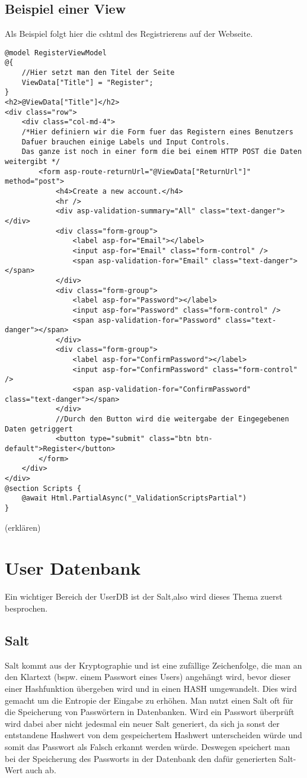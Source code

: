 {\subsection{Beispiel einer View}
\label{mvc_view_beispiel}
Als Beispiel folgt hier die cshtml des Registrierens auf der Webseite.
\begin{lstlisting}
@model RegisterViewModel
@{
	//Hier setzt man den Titel der Seite
    ViewData["Title"] = "Register";
}
<h2>@ViewData["Title"]</h2>
<div class="row">
    <div class="col-md-4">
    /*Hier definiern wir die Form fuer das Registern eines Benutzers
    Dafuer brauchen einige Labels und Input Controls. 
    Das ganze ist noch in einer form die bei einem HTTP POST die Daten weitergibt */
        <form asp-route-returnUrl="@ViewData["ReturnUrl"]" method="post">
            <h4>Create a new account.</h4>
            <hr />
            <div asp-validation-summary="All" class="text-danger"></div>
            <div class="form-group">
                <label asp-for="Email"></label>
                <input asp-for="Email" class="form-control" />
                <span asp-validation-for="Email" class="text-danger"></span>
            </div>
            <div class="form-group">
                <label asp-for="Password"></label>
                <input asp-for="Password" class="form-control" />
                <span asp-validation-for="Password" class="text-danger"></span>
            </div>
            <div class="form-group">
                <label asp-for="ConfirmPassword"></label>
                <input asp-for="ConfirmPassword" class="form-control" />
                <span asp-validation-for="ConfirmPassword" class="text-danger"></span>
            </div>
            //Durch den Button wird die weitergabe der Eingegebenen Daten getriggert
            <button type="submit" class="btn btn-default">Register</button>
        </form>
    </div>
</div>
@section Scripts {
    @await Html.PartialAsync("_ValidationScriptsPartial")
}
\end{lstlisting}
(erklären)
\textcite{mic_views}
\section{User Datenbank}
\label{sec:UserDB}
Ein wichtiger Bereich der UserDB ist der Salt,also wird dieses Thema zuerst besprochen.
\subsection{Salt}
\label{sec:salt}
Salt kommt aus der Kryptographie und ist eine zufällige Zeichenfolge, die man an den Klartext (bspw. einem Passwort eines Users) angehängt wird, bevor dieser einer Hashfunktion übergeben wird und in einen HASH umgewandelt. Dies wird gemacht um die Entropie der Eingabe zu erhöhen. Man nutzt einen Salt oft für die Speicherung von Passwörtern in Datenbanken. Wird ein Passwort überprüft wird dabei aber nicht jedesmal ein neuer Salt generiert, da sich ja sonst der entstandene Hashwert von dem gespeichertem Hashwert unterscheiden würde und somit das Passwort als Falsch erkannt werden würde. Deswegen speichert man bei der Speicherung des Passworts in der Datenbank den dafür generierten Salt-Wert auch ab.
}
